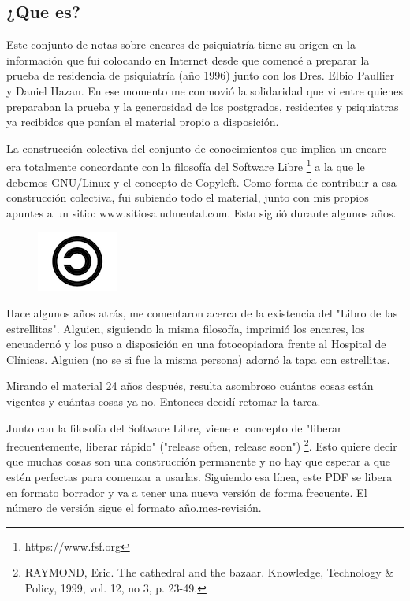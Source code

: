 \documentclass[encares.tex]{subfiles}
\begin{document}
\subsection*{¿Que es?}
Este conjunto de notas sobre encares de psiquiatría tiene su origen en la información que fui colocando en Internet desde que comencé a preparar la prueba de residencia de psiquiatría (año 1996) junto con los Dres. Elbio Paullier y Daniel Hazan. En ese momento me conmovió la solidaridad que vi entre quienes preparaban la prueba y la generosidad de los postgrados, residentes y psiquiatras ya recibidos que ponían el material propio a disposición.

La construcción colectiva del conjunto de conocimientos que implica un encare era totalmente concordante con la filosofía del Software Libre \footnote{https://www.fsf.org} a la que le debemos GNU/Linux y el concepto de Copyleft. Como forma de contribuir a esa construcción colectiva, fui subiendo todo el material, junto con mis propios apuntes a un sitio: www.sitiosaludmental.com. Esto siguió durante algunos años.
\begin{figure}
	\centering
	\includegraphics{copyleft.png}
\end{figure}
Hace algunos años atrás, me comentaron acerca de la existencia del "Libro de las estrellitas". Alguien, siguiendo la misma filosofía, imprimió los encares, los encuadernó y los puso a disposición en una fotocopiadora frente al Hospital de Clínicas. Alguien (no se si fue la misma persona) adornó la tapa con estrellitas.

Mirando el material 24 años después, resulta asombroso cuántas cosas están vigentes y cuántas cosas ya no. Entonces decidí retomar la tarea.

Junto con la filosofía del Software Libre, viene el concepto de "liberar frecuentemente, liberar rápido" ("release often, release soon") \footnote{RAYMOND, Eric. The cathedral and the bazaar. Knowledge, Technology \& Policy, 1999, vol. 12, no 3, p. 23-49.}. Esto quiere decir que muchas cosas son una construcción permanente y no hay que esperar a que estén perfectas para comenzar a usarlas. Siguiendo esa línea, este PDF se libera en formato borrador y va a tener una nueva versión de forma frecuente. El número de versión sigue el formato año.mes-revisión.
\end{document}
